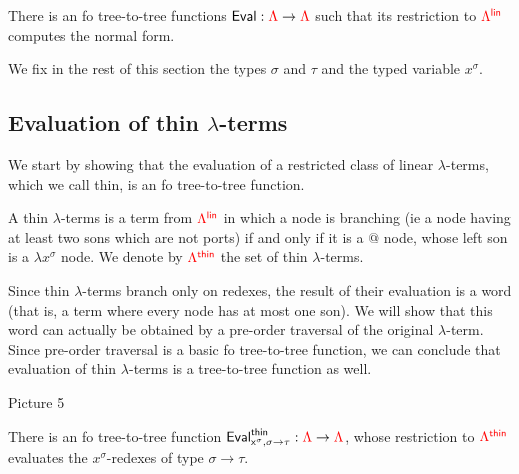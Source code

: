 \begin{theorem}
There is an fo tree-to-tree functions ${\sf{Eval}}:{\color{red}{\Lambda}} \to{\color{red}{\Lambda}}$ such that its restriction to ${\color{red}{\Lambda^{\sf{lin}}}}$ computes the normal form.
\end{theorem}


We fix in the rest of this section the types $\sigma$ and $\tau$ and the typed variable $x^\sigma$.

\subsection{Evaluation of thin $\lambda$-terms}

We start by showing that the evaluation of a restricted class of linear $\lambda$-terms, which we call thin, is an fo tree-to-tree function.   

\begin{definition}
A thin $\lambda$-terms is a term from ${\color{red}{\Lambda^{\sf{lin}}}}$ in which a node is branching (ie a node having at least two sons which are not ports) if and only if it is a $\text{@}$ node, whose left son is a $\lambda x^\sigma$ node. We denote by ${\color{red}{\Lambda^{\sf{thin}}}}$ the set of thin $\lambda$-terms.
\end{definition}

Since thin $\lambda$-terms branch only on redexes, the result of their evaluation is a word (that is, a term where every node has at most one son).  We will show that this word can actually be obtained by a pre-order traversal of the original $\lambda$-term. 
Since pre-order traversal is a basic fo tree-to-tree function, we can conclude that evaluation of thin $\lambda$-terms is a tree-to-tree function as well. 

\begin{center}
Picture 5
\end{center}

\begin{proposition}\label{prop:EvaluateThin}
There is an fo tree-to-tree function ${\sf{Eval}^{\sf{thin}}_{x^\sigma,\sigma\rightarrow\tau}}:{\color{red}{\Lambda}}\to{\color{red}{\Lambda}}$, whose restriction to ${\color{red}{\Lambda^{\sf{thin}}}}$ evaluates the $x^\sigma$-redexes of type $\sigma\rightarrow\tau$.
\end{proposition}

